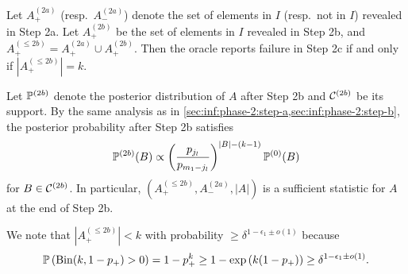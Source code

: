 Let $A_+^{(2a)}$ (resp.~$A_-^{(2a)}$) denote the set of elements in $I$ (resp.~not in $I$) revealed in Step 2a.
Let $A_+^{(2b)}$ be the set of elements in $I$ revealed in Step 2b, and $A_+^{(\le 2b)} = A_+^{(2a)} \cup A_+^{(2b)}$.
Then the oracle reports failure in Step 2c if and only if $\left|A_+^{(\le 2b)}\right| = k$.

Let $\mathbb{P}^{(2b)}$ denote the posterior distribution of $A$ after Step 2b and $\mathcal{C}^{(2b)}$ be its support.
By the same analysis as in \cref{sec:inf:phase-2:step-a,sec:inf:phase-2:step-b}, the posterior probability after Step 2b satisfies
\begin{align*}
  \mathbb{P}^{(2b)}(B) \propto \left(\frac{p_{j_l}}{p_{m_1-j_l}}\right)^{|B|-(k-1)} \mathbb{P}^{(0)}(B)
\end{align*}
for $B\in \mathcal{C}^{(2b)}$.
In particular, $\left( A_+^{(\le 2b)}, A_-^{(2a)}, |A|\right)$ is a sufficient statistic for $A$ at the end of Step 2b.

We note that $\left|A_+^{(\le 2b)}\right| < k$ with probability $\ge \delta^{1-\epsilon_1\pm o(1)}$ because
\begin{align} \label{eqn:th:step-2b:zero-prob}
  \mathbb{P}\left( \operatorname{\mathrm{Bin}}(k, 1-p_+) > 0 \right) = 1-p_+^k
  \ge 1-\exp\left( k(1-p_+)\right) \ge \delta^{1-\epsilon_1\pm o(1)}.
\end{align}



